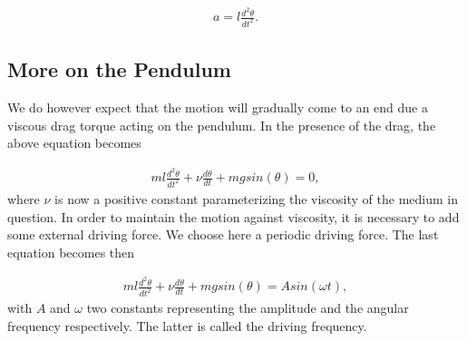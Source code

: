 \documentclass[letterpaper,10pt,english]{sphinxmanual}
\begin{document}
\begin{equation*}
\begin{split}
\begin{equation}
     a=l\frac{d^2\theta}{dt^2}.
\label{_auto21} \tag{22}
\end{equation}
\end{split}
\end{equation*}

\subsection{More on the Pendulum}
\label{\detokenize{chapter3:more-on-the-pendulum}}
We do however expect that the motion will gradually come to an end due a viscous drag torque acting on the pendulum.
In the presence of the drag, the above equation becomes




\begin{equation*}
\begin{split}
\begin{equation}
   ml\frac{d^2\theta}{dt^2}+\nu\frac{d\theta}{dt}  +mgsin(\theta)=0, \label{eq:pend1} \tag{23}
\end{equation}
\end{split}
\end{equation*}
where \(\nu\) is now a positive constant parameterizing the viscosity
of the medium in question. In order to maintain the motion against
viscosity, it is necessary to add some external driving force.
We choose here a periodic driving force. The last equation becomes then




\begin{equation*}
\begin{split}
\begin{equation}
   ml\frac{d^2\theta}{dt^2}+\nu\frac{d\theta}{dt}  +mgsin(\theta)=Asin(\omega t), \label{eq:pend2} \tag{24}
\end{equation}
\end{split}
\end{equation*}
with \(A\) and \(\omega\) two constants representing the amplitude and
the angular frequency respectively. The latter is called the driving frequency.
\end{document}
